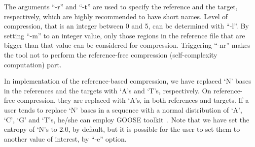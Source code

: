 The arguments ``-r'' and ``-t'' are used to specify the reference and the target, respectively, which are highly recommended to have short names. Level of compression, that is an integer between 0 and 5, can be determined with ``-l''. By setting ``-m'' to an integer value, only those regions in the reference file that are bigger than that value can be considered for compression. Triggering ``-nr'' makes the tool not to perform the reference-free compression (self-complexity computation) part.

In implementation of the reference-based compression, we have replaced `N' bases in the references and the targets with `A's and `T's, respectively. On reference-free compression, they are replaced with `A's, in both references and targets. If a user tends to replace `N' bases in a sequence with a normal distribution of `A', `C', `G' and `T's, he/she can employ GOOSE toolkit~\cite{web-goose}. Note that we have set the entropy of `N's to 2.0, by default, but it is possible for the user to set them to another value of interest, by ``-e'' option.

